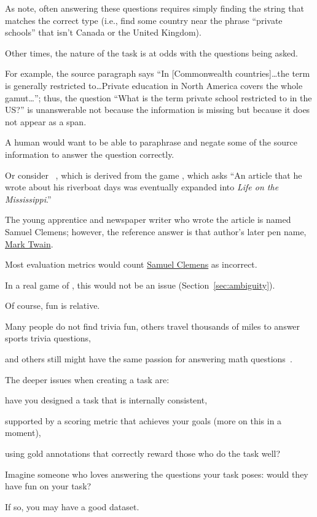 As  note, often answering these questions requires simply finding the string that matches the correct type (i.e., find some country near the phrase ``private schools'' that isn't Canada or the United Kingdom).

Other times, the nature of the task is at odds with the questions being asked.

For example, the source paragraph says ``In [Commonwealth countries]\dots the term is generally restricted to\dots Private education in North America covers the whole gamut\dots''; thus, the question ``What is the term private school restricted to in the US?'' is unanswerable not because the information is missing but because it does not appear as a span.

A human would want to be able to paraphrase and negate some of the source information to answer the question correctly.

Or consider \searchqa{}~\citep{dunn-17}, which is derived from the game \jeopardy{}, which asks ``An article that he wrote about his riverboat days was eventually expanded into \textit{Life on the Mississippi}.''

The young apprentice and newspaper writer who wrote the article is named Samuel Clemens; however, the reference answer is that author's later pen name, \underline{Mark Twain}.

Most \qa{} evaluation metrics would count \underline{Samuel Clemens} as incorrect.

In a real game of \jeopardy{}, this would not be an issue (Section~\ref{sec:ambiguity}).

Of course, fun is relative.

Many people do not find trivia fun, others travel thousands of miles to answer sports trivia questions,

and others still might have the same passion for answering math questions~\citep{amini-19}.

The deeper issues when creating a  task are:

have you designed a task that is internally consistent,

supported by a scoring metric that achieves your goals (more on this in a moment),

using gold annotations that correctly reward those who do the task well?

Imagine someone who loves answering the questions your task poses: would they have fun on your task?

If so, you may have a good dataset.

